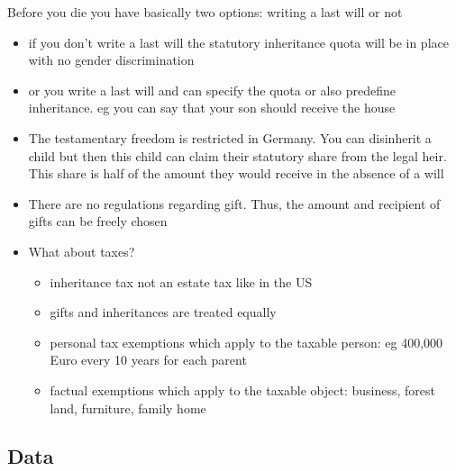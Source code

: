 \documentclass[
  letterpaper,
  DIV=11,
  numbers=noendperiod]{scrartcl}
\begin{document}
Before you die you have basically two options: writing a last will or
not

\begin{itemize}
\item
  if you don't write a last will the statutory inheritance quota will be
  in place with no gender discrimination
\item
  or you write a last will and can specify the quota or also predefine
  inheritance. eg you can say that your son should receive the house
\item
  The testamentary freedom is restricted in Germany. You can disinherit
  a child but then this child can claim their statutory share from the
  legal heir. This share is half of the amount they would receive in the
  absence of a will
\item
  There are no regulations regarding gift. Thus, the amount and
  recipient of gifts can be freely chosen
\item
  What about taxes?

  \begin{itemize}
  \item
    inheritance tax not an estate tax like in the US
  \item
    gifts and inheritances are treated equally
  \item
    personal tax exemptions which apply to the taxable person: eg
    400,000 Euro every 10 years for each parent
  \item
    factual exemptions which apply to the taxable object: business,
    forest land, furniture, family home
  \end{itemize}
\end{itemize}

\hypertarget{data}{%
\subsection{Data}\label{data}}
\end{document}
